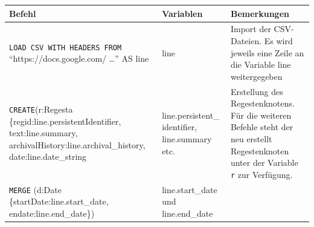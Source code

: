 \documentclass[12pt,ngerman,]{article}
\begin{document}
\begin{longtable}[]{@{}lll@{}}
\toprule
\begin{minipage}[b]{0.31\columnwidth}\raggedright\strut
Befehl\strut
\end{minipage} & \begin{minipage}[b]{0.23\columnwidth}\raggedright\strut
Variablen\strut
\end{minipage} & \begin{minipage}[b]{0.37\columnwidth}\raggedright\strut
Bemerkungen\strut
\end{minipage}\tabularnewline
\midrule
\endhead
\begin{minipage}[t]{0.31\columnwidth}\raggedright\strut
\texttt{LOAD\ CSV\ WITH\ HEADERS\ FROM} ``https://docs.google.com/
\ldots{}'' AS line\strut
\end{minipage} & \begin{minipage}[t]{0.23\columnwidth}\raggedright\strut
line\strut
\end{minipage} & \begin{minipage}[t]{0.37\columnwidth}\raggedright\strut
Import der CSV-Dateien. Es wird jeweils eine Zeile an die Variable line
weitergegeben\strut
\end{minipage}\tabularnewline
\begin{minipage}[t]{0.31\columnwidth}\raggedright\strut
\texttt{CREATE}(r:Regesta \{regid:line.persistentIdentifier,
text:line.summary, archivalHistory:line.archival\_history,
date:line.date\_string\strut
\end{minipage} & \begin{minipage}[t]{0.23\columnwidth}\raggedright\strut
line.persistent\_ identifier, line.summary etc.\strut
\end{minipage} & \begin{minipage}[t]{0.37\columnwidth}\raggedright\strut
Erstellung des Regestenknotens. Für die weiteren Befehle steht der neu
erstellt Regestenknoten unter der Variable \texttt{r} zur
Verfügung.\strut
\end{minipage}\tabularnewline
\begin{minipage}[t]{0.31\columnwidth}\raggedright\strut
\texttt{MERGE} (d:Date \{startDate:line.start\_date,
endate:line.end\_date\})\strut
\end{minipage} & \begin{minipage}[t]{0.23\columnwidth}\raggedright\strut
line.start\_date und line.end\_date\strut
\end{minipage} & \begin{minipage}[t]{0.37\columnwidth}\raggedright\strut

\end{minipage}
\end{longtable}
\end{document}
